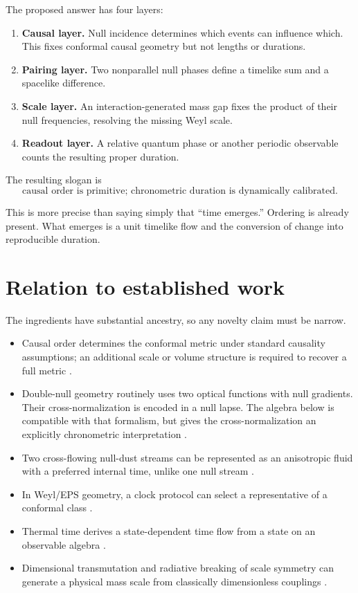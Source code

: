 \documentclass[11pt,a4paper]{article}
\begin{document}
The proposed answer has four layers:

\begin{enumerate}
  \item \textbf{Causal layer.} Null incidence determines which events can influence which. This fixes conformal causal geometry but not lengths or durations.
  \item \textbf{Pairing layer.} Two nonparallel null phases define a timelike sum and a spacelike difference.
  \item \textbf{Scale layer.} An interaction-generated mass gap fixes the product of their null frequencies, resolving the missing Weyl scale.
  \item \textbf{Readout layer.} A relative quantum phase or another periodic observable counts the resulting proper duration.
\end{enumerate}

The resulting slogan is
\[
\boxed{
\text{causal order is primitive; chronometric duration is dynamically calibrated.}
}
\]

This is more precise than saying simply that ``time emerges.'' Ordering is already present. What emerges is a unit timelike flow and the conversion of change into reproducible duration.

\section{Relation to established work}

The ingredients have substantial ancestry, so any novelty claim must be narrow.

\begin{itemize}
  \item Causal order determines the conformal metric under standard causality assumptions; an additional scale or volume structure is required to recover a full metric \cite{EPS1972,HKM1976,Malament1977,Braun2025}.
  \item Double-null geometry routinely uses two optical functions with null gradients. Their cross-normalization is encoded in a null lapse. The algebra below is compatible with that formalism, but gives the cross-normalization an explicitly chronometric interpretation \cite{Gourgoulhon2005,Czimek2022}.
  \item Two cross-flowing null-dust streams can be represented as an anisotropic fluid with a preferred internal time, unlike one null stream \cite{Horvath2006,Kovacs2006}.
  \item In Weyl/EPS geometry, a clock protocol can select a representative of a conformal class \cite{Fatibene2022}.
  \item Thermal time derives a state-dependent time flow from a state on an observable algebra \cite{ConnesRovelli1994}.
  \item Dimensional transmutation and radiative breaking of scale symmetry can generate a physical mass scale from classically dimensionless couplings \cite{ColemanWeinberg1973,GrossNeveu1974,Oda2020}.
\end{itemize}
\end{document}
